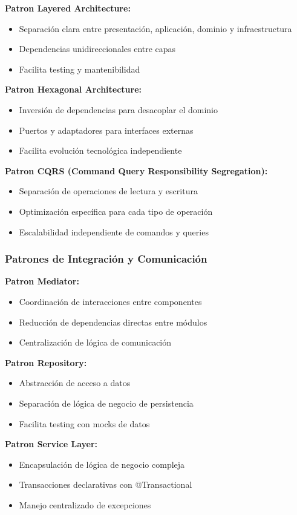 \textbf{Patron Layered Architecture:}
\begin{itemize}
\item Separación clara entre presentación, aplicación, dominio y infraestructura
\item Dependencias unidireccionales entre capas
\item Facilita testing y mantenibilidad
\end{itemize}

\textbf{Patron Hexagonal Architecture:}
\begin{itemize}
\item Inversión de dependencias para desacoplar el dominio
\item Puertos y adaptadores para interfaces externas
\item Facilita evolución tecnológica independiente
\end{itemize}

\textbf{Patron CQRS (Command Query Responsibility Segregation):}
\begin{itemize}
\item Separación de operaciones de lectura y escritura
\item Optimización específica para cada tipo de operación
\item Escalabilidad independiente de comandos y queries
\end{itemize}

\subsubsection{Patrones de Integración y Comunicación}

\textbf{Patron Mediator:}
\begin{itemize}
\item Coordinación de interacciones entre componentes
\item Reducción de dependencias directas entre módulos
\item Centralización de lógica de comunicación
\end{itemize}

\textbf{Patron Repository:}
\begin{itemize}
\item Abstracción de acceso a datos
\item Separación de lógica de negocio de persistencia
\item Facilita testing con mocks de datos
\end{itemize}

\textbf{Patron Service Layer:}
\begin{itemize}
\item Encapsulación de lógica de negocio compleja
\item Transacciones declarativas con @Transactional
\item Manejo centralizado de excepciones
\end{itemize}

